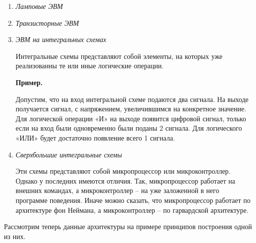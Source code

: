\documentclass[a4paper, fleqn]{article}
\newenvironment{example}[1][]{\medskip \noindent \textbf{Пример. #1}\par \nopagebreak}{\medskip \par} %
\begin{document}
		\begin{enumerate}
			\item \emph{Ламповые ЭВМ}
			
			
			\item \emph{Транзисторные ЭВМ}
			
			
			\item \emph{ЭВМ на интегральных схемах}
			
			Интегральные схемы представляют собой элементы, на которых уже реализованны те или иные логические операции.
			
			\begin{example}{}
				Допустим, что на вход интегральной схеме подаются два сигнала. На выходе получается сигнал, с напряжением, увеличившимся на конкретное значение. Для логической операции «И» на выходе появится цифровой сигнал, только если на вход были одновременно были поданы 2 сигнала. Для логического «ИЛИ» будет достаточно появление всего 1 сигнала.
			\end{example}
			
			\item \emph{Сверхбольшие интегральные схемы}
			
			Эти схемы представляют собой микропроцессор или микроконтроллер. Однако у последних имеются отличия. Так, микропроцессор работает на внешних командах, а микроконтроллер -- на уже заложенной в него программе поведения. Иначе можно сказать, что микропроцессор работает по архитектуре фон Неймана, а микроконтроллер -- по гарвардской архитектуре. 
				 
		\end{enumerate}
		
		Рассмотрим теперь данные архитектуры на примере принципов построения одной из них.
		
\end{document}
